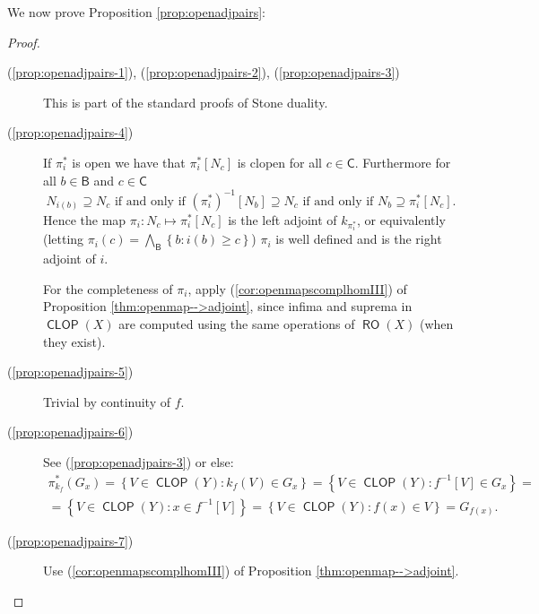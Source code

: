 \documentclass[11pt]{amsart}
\theoremstyle{plain}
\theoremstyle{definition}
\theoremstyle{plain}
\theoremstyle{remark}
\DeclareMathOperator{\RO}{\mathsf{RO}}
\DeclareMathOperator{\CLOP}{\mathsf{CLOP}}
\newcommand{\bool}[1]{\mathsf{#1}}
\newcommand{\bp}[1]{\left\lbrace #1 \right\rbrace}
\newcommand{\0}{\mathsf{0}}
\renewcommand{\1}{\mathsf{1}}
\renewcommand{\2}{\mathsf{2}}
\theoremstyle{definition}
\begin{document}
We now prove Proposition \ref{prop:openadjpairs}:

\begin{proof}
\emph{}

\begin{description}
\item[(\ref{prop:openadjpairs-1}), (\ref{prop:openadjpairs-2}), (\ref{prop:openadjpairs-3})]
This is part of the standard proofs of Stone duality. 

\item[(\ref{prop:openadjpairs-4})]
If $\pi^*_i$ is open we have that $\pi^*_i[N_c]$ is clopen for all $c\in\bool{C}$. 
Furthermore for all $b\in\bool{B}$ and $c\in\bool{C}$
\[
N_{i(b)}\supseteq N_c\text{ if and only if }(\pi^*_i)^{-1}[N_b]\supseteq N_c
\text{ if and only if } N_b\supseteq \pi^*_i[N_c].
\] 
Hence
the map $\pi_i:N_c\mapsto \pi^*_i[N_c]$ is the left adjoint of $k_{\pi^*_i}$, or equivalently (letting 
$\pi_i(c)=\bigwedge_{\bool{B}}\bp{b:i(b)\geq c}$) $\pi_i$ is well defined and is the right adjoint of $i$.

For the completeness of $\pi_i$, apply  (\ref{cor:openmapscomplhomIII}) of  Proposition \ref{thm:openmap-->adjoint}, since infima and suprema in $\CLOP(X)$ are computed using the same operations of $\RO(X)$ (when they exist).

\item[(\ref{prop:openadjpairs-5})]
Trivial by continuity of $f$.

\item[(\ref{prop:openadjpairs-6})]
See (\ref{prop:openadjpairs-3}) or else:
\begin{align*}
\pi^*_{k_f}(G_x)=\bp{V\in\CLOP(Y): k_f(V)\in G_x}=\bp{V\in\CLOP(Y): f^{-1}[V]\in G_x}=\\
=\bp{V\in\CLOP(Y): x\in f^{-1}[V]}=\bp{V\in\CLOP(Y): f(x)\in V}=G_{f(x)}.
\end{align*}

\item[(\ref{prop:openadjpairs-7})]
Use (\ref{cor:openmapscomplhomIII}) of  Proposition \ref{thm:openmap-->adjoint}.

\end{description}
\end{proof}
\end{document}
